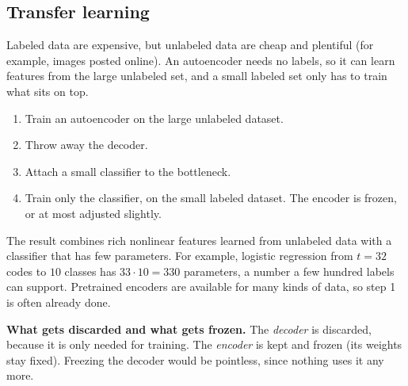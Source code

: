\documentclass[11pt]{article}
\newcommand{\bm}[1]{\symbfit{#1}}
\newcommand{\R}{\mathbb{R}}
\newcommand{\vx}{\bm{x}}
\begin{document}
\subsection{Transfer learning}

Labeled data are expensive, but unlabeled data are cheap and plentiful (for example, images posted online). An autoencoder needs no labels, so it can learn features from the large unlabeled set, and a small labeled set only has to train what sits on top.

\begin{center}
\end{center}
\begin{enumerate}[nosep]
\item Train an autoencoder on the large unlabeled dataset.
\item Throw away the decoder.
\item Attach a small classifier to the bottleneck.
\item Train only the classifier, on the small labeled dataset. The encoder is frozen, or at most adjusted slightly.
\end{enumerate}
The result combines rich nonlinear features learned from unlabeled data with a classifier that has few parameters. For example, logistic regression from $t=32$ codes to $10$ classes has $33\cdot10=330$ parameters, a number a few hundred labels can support. Pretrained encoders are available for many kinds of data, so step 1 is often already done.

\begin{careful}
\textbf{What gets discarded and what gets frozen.} The \emph{decoder} is discarded, because it is only needed for training. The \emph{encoder} is kept and frozen (its weights stay fixed). Freezing the decoder would be pointless, since nothing uses it any more.
\end{careful}
\end{document}
